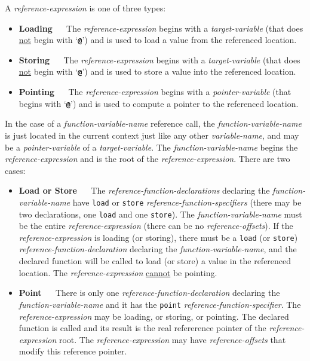\documentclass[12pt]{article}
\newcommand{\TT}[1]{{\tt \bfseries #1}}
\newcommand{\key}[1]{{\rm \bfseries #1}}
\begin{document}
A {\em reference-expression} is one of three types:
\begin{itemize}
\item \key{Loading} ~~ The {\em reference-expression} begins with a
{\em target-variable} (that does \underline{not} begin with `\TT{@}')
and is used to load a value from the referenced location.
\item \key{Storing} ~~ The {\em reference-expression} begins with a
{\em target-variable} (that does \underline{not} begin with `\TT{@}')
and is used to store a value into the referenced location.
\item \key{Pointing} ~~ The {\em reference-expression} begins with a
{\em pointer-variable} (that begins with `\TT{@}')
and is used to compute a pointer to the referenced location.
\end{itemize}

In the case of a {\em function-variable-name} reference call,
the {\em function-variable-name} is just located in the current
context just like any other {\em variable-name}, and may be
a {\em pointer-variable} of a {\em target-variable}.
The {\em function-variable-name} begins the {\em reference-expression}
and is the root of the {\em reference-expression}.
There are two cases:
\begin{itemize}
\item {\bf Load or Store} ~~
The {\em reference-function-declarations}
declaring the {\em function-variable-name} have {\tt load}
or {\tt store} {\em reference-function-specifiers} (there may be
two declarations, one {\tt load} and one {\tt store}).
The {\em function-variable-name} must be 
the entire {\em reference-expression}
(there can be no {\em reference-offsets}).
If the {\em reference-expression} is loading (or storing), there
must be a {\tt load} (or {\tt store}) {\em reference-function-declaration}
declaring the {\em function-variable-name}, and the declared function will
be called to load (or store) a value in the referenced location.
The {\em reference-expression} \underline{cannot} be pointing.
\item {\bf Point} ~~
There is only one {\em reference-function-declaration}
declaring the {\em function-vari\-able-name} and it has the {\tt point}
{\em reference-function-specifier}.
The {\em reference-expression} may be loading, or storing, or pointing.
The declared function is called and its result is the real refererence pointer
of the {\em reference-expression} root.  The {\em reference-expression}
may have {\em reference-offsets} that modify this reference pointer.
\end{itemize}
\end{document}
